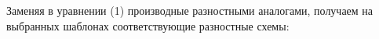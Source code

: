 \documentclass[a4paper,14pt]{article}
\begin{document}
\begin{figure}[!h]
	\label{fig:t236}
\end{figure}

Заменяя в уравнении (1) производные разностными аналогами, получаем на
выбранных шаблонах соответствующие разностные схемы:
\end{document}
